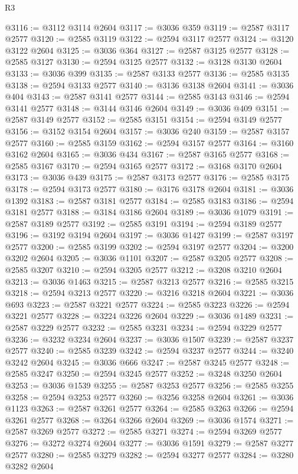 \begin{lexlean}{R3}
\begin{coremodule}
@3116 := @3112 @3114 @2604
@3117 := @3036 @359
@3119 := @2587 @3117 @2577
@3120 := @2585 @3119
@3122 := @2594 @3117 @2577
@3124 := @3120 @3122 @2604
@3125 := @3036 @364
@3127 := @2587 @3125 @2577
@3128 := @2585 @3127
@3130 := @2594 @3125 @2577
@3132 := @3128 @3130 @2604
@3133 := @3036 @399
@3135 := @2587 @3133 @2577
@3136 := @2585 @3135
@3138 := @2594 @3133 @2577
@3140 := @3136 @3138 @2604
@3141 := @3036 @404
@3143 := @2587 @3141 @2577
@3144 := @2585 @3143
@3146 := @2594 @3141 @2577
@3148 := @3144 @3146 @2604
@3149 := @3036 @409
@3151 := @2587 @3149 @2577
@3152 := @2585 @3151
@3154 := @2594 @3149 @2577
@3156 := @3152 @3154 @2604
@3157 := @3036 @240
@3159 := @2587 @3157 @2577
@3160 := @2585 @3159
@3162 := @2594 @3157 @2577
@3164 := @3160 @3162 @2604
@3165 := @3036 @434
@3167 := @2587 @3165 @2577
@3168 := @2585 @3167
@3170 := @2594 @3165 @2577
@3172 := @3168 @3170 @2604
@3173 := @3036 @439
@3175 := @2587 @3173 @2577
@3176 := @2585 @3175
@3178 := @2594 @3173 @2577
@3180 := @3176 @3178 @2604
@3181 := @3036 @1392
@3183 := @2587 @3181 @2577
@3184 := @2585 @3183
@3186 := @2594 @3181 @2577
@3188 := @3184 @3186 @2604
@3189 := @3036 @1079
@3191 := @2587 @3189 @2577
@3192 := @2585 @3191
@3194 := @2594 @3189 @2577
@3196 := @3192 @3194 @2604
@3197 := @3036 @1427
@3199 := @2587 @3197 @2577
@3200 := @2585 @3199
@3202 := @2594 @3197 @2577
@3204 := @3200 @3202 @2604
@3205 := @3036 @1101
@3207 := @2587 @3205 @2577
@3208 := @2585 @3207
@3210 := @2594 @3205 @2577
@3212 := @3208 @3210 @2604
@3213 := @3036 @1463
@3215 := @2587 @3213 @2577
@3216 := @2585 @3215
@3218 := @2594 @3213 @2577
@3220 := @3216 @3218 @2604
@3221 := @3036 @693
@3223 := @2587 @3221 @2577
@3224 := @2585 @3223
@3226 := @2594 @3221 @2577
@3228 := @3224 @3226 @2604
@3229 := @3036 @1489
@3231 := @2587 @3229 @2577
@3232 := @2585 @3231
@3234 := @2594 @3229 @2577
@3236 := @3232 @3234 @2604
@3237 := @3036 @1507
@3239 := @2587 @3237 @2577
@3240 := @2585 @3239
@3242 := @2594 @3237 @2577
@3244 := @3240 @3242 @2604
@3245 := @3036 @666
@3247 := @2587 @3245 @2577
@3248 := @2585 @3247
@3250 := @2594 @3245 @2577
@3252 := @3248 @3250 @2604
@3253 := @3036 @1539
@3255 := @2587 @3253 @2577
@3256 := @2585 @3255
@3258 := @2594 @3253 @2577
@3260 := @3256 @3258 @2604
@3261 := @3036 @1123
@3263 := @2587 @3261 @2577
@3264 := @2585 @3263
@3266 := @2594 @3261 @2577
@3268 := @3264 @3266 @2604
@3269 := @3036 @1574
@3271 := @2587 @3269 @2577
@3272 := @2585 @3271
@3274 := @2594 @3269 @2577
@3276 := @3272 @3274 @2604
@3277 := @3036 @1591
@3279 := @2587 @3277 @2577
@3280 := @2585 @3279
@3282 := @2594 @3277 @2577
@3284 := @3280 @3282 @2604

\end{coremodule}
\end{lexlean}
